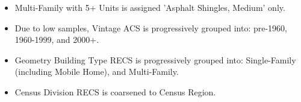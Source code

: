 \begin{itemize}
\item Multi-Family with 5+ Units is assigned 'Asphalt Shingles, Medium' only.
\item Due to low samples, Vintage ACS is progressively grouped into: pre-1960, 1960-1999, and 2000+.
\item Geometry Building Type RECS is progressively grouped into: Single-Family (including Mobile Home), and Multi-Family.
\item Census Division RECS is coarsened to Census Region.
\end{itemize}
